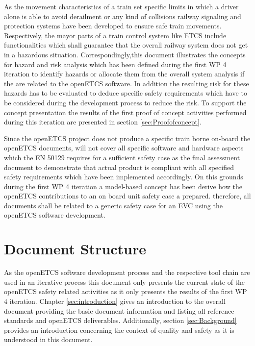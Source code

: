\documentclass{template/openetcs_report}
\begin{document}
As the movement characteristics of a train set specific limits in which a driver alone is able to avoid derailment or any kind of collisions railway signaling and protection systems have been developed to ensure safe train movements. Respectively, the mayor parts of a train control system like ETCS include functionalities which shall guarantee that the overall railway system does not get in a hazardous situation. Correspondingly,this document illustrates the concepts for hazard and risk analysis which has been defined during the first WP 4 iteration to identify hazards or allocate them from the overall system analysis if the are related to the openETCS software. In addition the resulting risk for these hazards has to be evaluated to deduce specific safety requirements which have to be considered during the development process to reduce the risk. To support the concept presentation the results of the first proof of concept activities performed during this iteration are presented in section \ref{sec:Proofofconcept}.

Since the openETCS project does not produce a specific train borne on-board the openETCS documents, will not cover all specific software and hardware aspects which the EN 50129 requires for a sufficient safety case as the final assessment document to demonstrate that actual product is compliant with all specified safety requirements which have been implemented accordingly. On this grounds during the first WP 4 iteration a model-based concept has been derive how the openETCS contributions to an on board unit safety case a prepared. therefore, all documents shall be related to a generic safety case for an EVC using the openETCS software development.

\section{Document Structure}
\label{sec:document-structure}

As the openETCS software development process and the respective tool chain are used in an iterative process this document only presents the current state of the openETCS safety related activities as it only presents the results of the first WP 4 iteration. Chapter \ref{sec:introduction} gives an introduction to the overall document providing the basic document information and listing all reference standards and openETCS deliverables. Additionally, section \ref{sec:Background} provides an introduction concerning the context of quality and safety as it is understood in this document.
\end{document}
